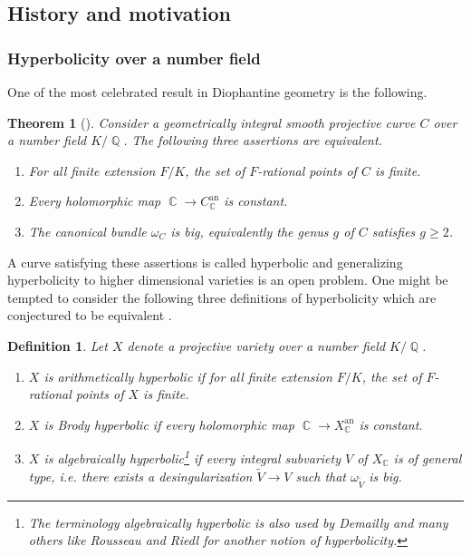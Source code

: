 \documentclass[11pt]{amsart}
\numberwithin{subsection}{section}
\numberwithin{figure}{section}
\numberwithin{table}{section}
\theoremstyle{1}
\newtheorem*{theorem*}{Theorem}
\newtheorem*{definition*}{Definition}
\theoremstyle{2}
\DeclareMathOperator{\Q}{\mathbb{Q}}
\DeclareMathOperator{\C}{\mathbb{C}}
\begin{document}
\subsection{History and motivation}
\subsubsection*{Hyperbolicity over a number field}
One of the most celebrated result in Diophantine geometry is the following.
\begin{theorem*}[{\cite{MR718935}}]
Consider a geometrically integral smooth projective curve $C$ over a number field $K/\Q$. The following three assertions are equivalent.
\begin{enumerate}
\item For all finite extension $F/K$, the set of $F$-rational points of $C$ is finite.
\item Every holomorphic map $\C \rightarrow C_{\C}^{\text{an}}$ is constant.
\item The canonical bundle $\omega_C$ is big, equivalently the genus $g$ of $C$ satisfies $g \geq 2$.
\end{enumerate}
\end{theorem*}
A curve satisfying these assertions is called hyperbolic and generalizing hyperbolicity to higher dimensional varieties is an open problem. One might be tempted to consider the following three definitions of hyperbolicity which are conjectured to be equivalent \cite[Conjecture 5.6/5.8]{MR828820}.
\begin{definition*}
Let $X$ denote a projective variety over a number field $K/\Q$.
\begin{enumerate}
\item $X$ is arithmetically hyperbolic if for all finite extension $F/K$, the set of $F$-rational points of $X$ is finite.
\item $X$ is Brody hyperbolic if every holomorphic map $\C \rightarrow X_{\C}^{\text{an}}$ is constant.
\item $X$ is algebraically hyperbolic\footnote{The terminology \emph{algebraically hyperbolic} is also used by Demailly and many others like Rousseau and Riedl for another notion of hyperbolicity.} if every integral subvariety $V$ of $X_{\C}$ is of general type, i.e. there exists a desingularization $\tilde{V} \rightarrow V$ such that $\omega_{\tilde{V}}$ is big.
\end{enumerate}
\end{definition*}
\vspace{0.2cm}
\end{document}
